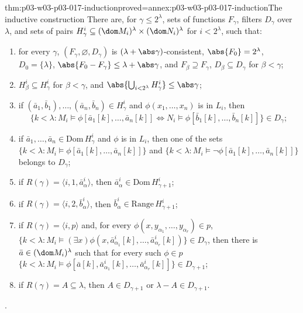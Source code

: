 \begin{hbtheorem}{thm:p03-w03-p03-017-induction}{proved=annex:p03-w03-p03-017-induction}{The inductive construction}
There are, for \(\gamma\le2^\lambda\), sets of functions \(F_\gamma\),
filters \(D_\gamma\) over \(\lambda\), and sets of pairs
\(H^i_\gamma\subseteq(\dom M_i)^\lambda\times(\dom N_i)^\lambda\) for
\(i<2^\lambda\), such that:
\begin{enumerate}
  \item for every \(\gamma\), \((F_\gamma,\varnothing,D_\gamma)\) is
        \((\lambda+\abs\gamma)\)-consistent, \(\abs{F_0}=2^\lambda\),
        \(D_0=\{\lambda\}\), \(\abs{F_0-F_\gamma}\le\lambda+\abs\gamma\),
        and \(F_\beta\supseteq F_\gamma\), \(D_\beta\subseteq D_\gamma\) for
        \(\beta<\gamma\);
  \item \(H^i_\beta\subseteq H^i_\gamma\) for \(\beta<\gamma\), and
        \(\abs{\bigcup_{i<2^\lambda}H^i_\gamma}\le\abs\gamma\);
  \item if \((\bar a_1,\bar b_1),\ldots,(\bar a_n,\bar b_n)\in H^i_\gamma\)
        and \(\phi(x_1,\ldots,x_n)\) is in \(L_i\), then
        \[
          \{k<\lambda:M_i\models\phi[\bar a_1[k],\ldots,\bar a_n[k]]
          \Leftrightarrow N_i\models\phi[\bar b_1[k],\ldots,\bar b_n[k]]\}
          \in D_\gamma;
        \]
  \item if \(\bar a_1,\ldots,\bar a_n\in\mathrm{Dom}\,H^i_\gamma\) and
        \(\phi\) is in \(L_i\), then one of the sets
        \(\{k<\lambda:M_i\models\phi[\bar a_1[k],\ldots,\bar a_n[k]]\}\) and
        \(\{k<\lambda:M_i\models\neg\phi[\bar a_1[k],\ldots,\bar a_n[k]]\}\)
        belongs to \(D_\gamma\);
  \item if \(R(\gamma)=\langle i,1,\bar a^i_\alpha\rangle\), then
        \(\bar a^i_\alpha\in\mathrm{Dom}\,H^i_{\gamma+1}\);
  \item if \(R(\gamma)=\langle i,2,\bar b^i_\alpha\rangle\), then
        \(\bar b^i_\alpha\in\mathrm{Range}\,H^i_{\gamma+1}\);
  \item if \(R(\gamma)=\langle i,p\rangle\) and, for every
        \(\phi(x,y_{\alpha_1},\ldots,y_{\alpha_r})\in p\),
        \(\{k<\lambda:M_i\models(\exists x)\phi(x,\bar a^i_{\alpha_1}[k],
        \ldots,\bar a^i_{\alpha_r}[k])\}\in D_\gamma\), then there is
        \(\bar a\in(\dom M_i)^\lambda\) such that for every such \(\phi\in p\)
        \(\{k<\lambda:M_i\models\phi[\bar a[k],\bar a^i_{\alpha_1}[k],\ldots,
        \bar a^i_{\alpha_r}[k]]\}\in D_{\gamma+1}\);
  \item if \(R(\gamma)=A\subseteq\lambda\), then \(A\in D_{\gamma+1}\) or
        \(\lambda-A\in D_{\gamma+1}\).
\end{enumerate}
\cite[p.~231, conditions 1)--8); p.~232, Cases I--VI]{Shelah1971Ultrapowers}.
\end{hbtheorem}

